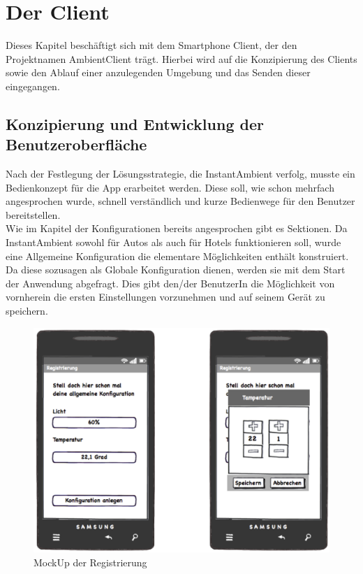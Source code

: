 \chapter{Der Client}
Dieses Kapitel beschäftigt sich mit dem Smartphone Client, der den Projektnamen AmbientClient trägt. Hierbei wird auf die Konzipierung des Clients sowie den Ablauf einer anzulegenden Umgebung und das Senden dieser eingegangen. 

\section{Konzipierung und Entwicklung der Benutzeroberfläche}
Nach der Festlegung der Lösungsstrategie, die InstantAmbient verfolg, musste ein Bedienkonzept für die App erarbeitet werden. Diese soll, wie schon mehrfach angesprochen wurde, schnell verständlich und kurze Bedienwege für den Benutzer bereitstellen. \\ 
Wie im Kapitel der Konfigurationen bereits angesprochen gibt es Sektionen. Da InstantAmbient sowohl für Autos als auch für Hotels funktionieren soll, wurde eine Allgemeine Konfiguration die elementare Möglichkeiten enthält konstruiert. Da diese sozusagen als Globale Konfiguration dienen, werden sie mit dem Start der Anwendung abgefragt. Dies gibt den/der BenutzerIn die Möglichkeit von vornherein die ersten Einstellungen vorzunehmen und auf seinem Gerät zu speichern.  

\begin{figure}[H]
\includegraphics[width=12.5cm]{MockUps/Registrierung}
\caption{MockUp der Registrierung}
\end{figure}

